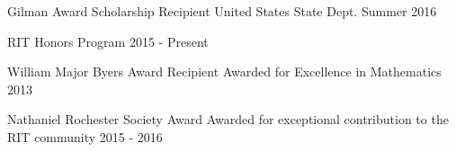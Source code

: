 


\begin{cvhonors}


\cvhonor
{Gilman Award Scholarship Recipient} %
{United States State Dept.} %
{}
{Summer 2016} %


\cvhonor
{RIT Honors Program} %
{} %
{} %
{2015 - Present} %


\cvhonor
{William Major Byers Award Recipient} %
{Awarded for Excellence in Mathematics} %
{} %
{2013} %


\cvhonor
{Nathaniel Rochester Society Award} %
{Awarded for exceptional contribution to the RIT community} %
{} %
{2015 - 2016} %


\end{cvhonors}

